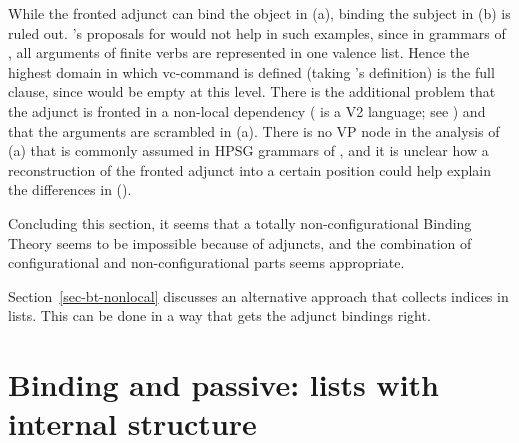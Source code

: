 \documentclass[output=paper,biblatex,babelshorthands,newtxmath,draftmode,colorlinks,citecolor=brown]{langscibook}
\begin{document}
While the fronted adjunct can bind the object in (a), binding the subject in (b) is
ruled out. \citeauthor{Walker2011a}'s proposals for  would not help in such examples, since in grammars of , all arguments of
finite verbs are represented in one valence list. Hence the highest domain in
which vc-command is defined (taking \citeauthor{HL95b}'s definition) is the full clause, since \comps
would be empty at this level. There is the additional problem that the adjunct is fronted in a
non-local dependency ( is a V2 language; see \cites[Chapter~2.4]{Erdmann1886a}[, ]{Paul1919a}[Section~3]{MuellerGermanHandbook}) and that the arguments are scrambled in
(a). There is no VP node in the analysis of (a) that is commonly assumed in HPSG
grammars of , and it is unclear how a reconstruction of the fronted adjunct into a certain
position could help explain the differences in ().




Concluding this section, it seems that a totally non-configurational Binding Theory seems to be
impossible because of adjuncts, and the combination of configurational and non-configurational parts
seems appropriate. 

Section~\ref{sec-bt-nonlocal} discusses an alternative approach that collects indices in lists. This can be done in a
way that gets the adjunct bindings right.
 





\section{Binding and passive: \texorpdfstring{\argst}{ARG-ST} lists with internal structure}
\label{binding-sec-passive}
\end{document}
